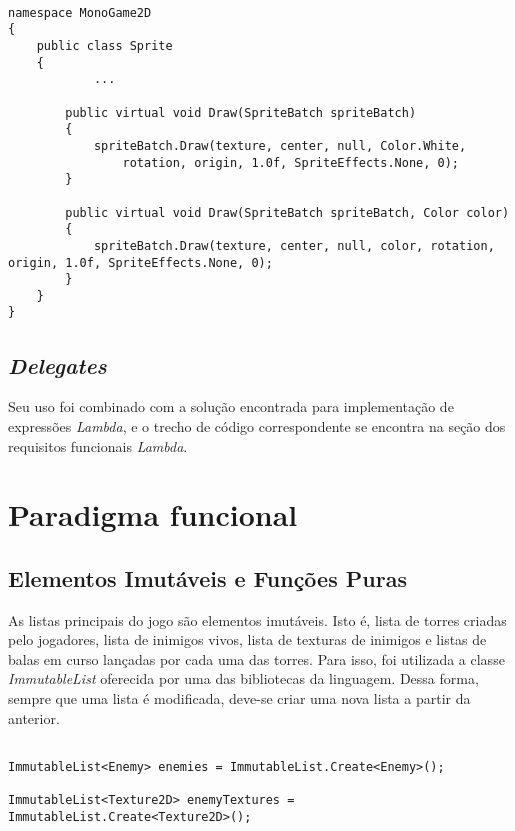 \documentclass[rel_mlp]{iiufrgs}
\begin{document}
\begin{lstlisting}[caption=Trecho de código C\# retirado da implementação deste trabalho, label=lst:test]

namespace MonoGame2D
{
    public class Sprite
    {
			...
			
		public virtual void Draw(SpriteBatch spriteBatch)
        {
            spriteBatch.Draw(texture, center, null, Color.White,
                rotation, origin, 1.0f, SpriteEffects.None, 0);
        }

        public virtual void Draw(SpriteBatch spriteBatch, Color color)
        {
            spriteBatch.Draw(texture, center, null, color, rotation, origin, 1.0f, SpriteEffects.None, 0);
        }
    }
}

\end{lstlisting}

\subsection{\textit{Delegates}}

Seu uso foi combinado com a solução encontrada para implementação de expressões \textit{Lambda}, e o trecho de código correspondente se encontra na seção dos requisitos funcionais \textit{Lambda}.

\section{Paradigma funcional}

\subsection{Elementos Imutáveis e Funções Puras}

As listas principais do jogo são elementos imutáveis. Isto é, lista de torres criadas pelo jogadores, lista de inimigos vivos, lista de texturas de inimigos e listas de balas em curso lançadas por cada uma das torres. Para isso, foi utilizada a classe \textit{ImmutableList} oferecida por uma das bibliotecas da linguagem. Dessa forma, sempre que uma lista é modificada, deve-se criar uma nova lista a partir da anterior.

\begin{lstlisting}[caption=Trecho de código C\# retirado da implementação deste trabalho, label=lst:test]

ImmutableList<Enemy> enemies = ImmutableList.Create<Enemy>();

ImmutableList<Texture2D> enemyTextures = ImmutableList.Create<Texture2D>();

\end{lstlisting}
\end{document}
